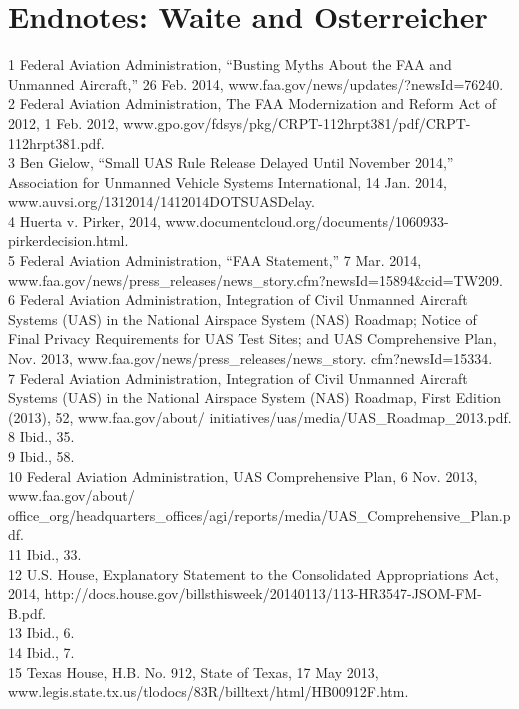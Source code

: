 \section{Endnotes: Waite and Osterreicher}
1 Federal Aviation Administration, ``Busting Myths About the FAA and Unmanned Aircraft,'' 26 Feb.
2014, www.faa.gov/news/updates/?newsId=76240.\\
2 Federal Aviation Administration, The FAA Modernization and Reform Act of 2012, 1 Feb. 2012,
www.gpo.gov/fdsys/pkg/CRPT-112hrpt381/pdf/CRPT-112hrpt381.pdf.\\
3 Ben Gielow, ``Small UAS Rule Release Delayed Until November 2014,'' Association for Unmanned
Vehicle Systems International, 14 Jan. 2014, www.auvsi.org/1312014/1412014DOTSUASDelay.\\
4 Huerta v. Pirker, 2014, www.documentcloud.org/documents/1060933-pirkerdecision.html.\\
5 Federal Aviation Administration, ``FAA Statement,'' 7 Mar. 2014, www.faa.gov/news/press_releases/news_story.cfm?newsId=15894&cid=TW209.\\
6 Federal Aviation Administration, Integration of Civil Unmanned Aircraft Systems (UAS) in the
National Airspace System (NAS) Roadmap; Notice of Final Privacy Requirements for UAS Test
Sites; and UAS Comprehensive Plan, Nov. 2013, www.faa.gov/news/press_releases/news_story.
cfm?newsId=15334.\\
7 Federal Aviation Administration, Integration of Civil Unmanned Aircraft Systems (UAS) in
the National Airspace System (NAS) Roadmap, First Edition (2013), 52, www.faa.gov/about/
initiatives/uas/media/UAS_Roadmap_2013.pdf.\\
8 Ibid., 35.\\
9 Ibid., 58.\\
10 Federal Aviation Administration, UAS Comprehensive Plan, 6 Nov. 2013, www.faa.gov/about/
office_org/headquarters_offices/agi/reports/media/UAS_Comprehensive_Plan.pdf.\\
11 Ibid., 33.\\
12 U.S. House, Explanatory Statement to the Consolidated Appropriations Act, 2014,
http://docs.house.gov/billsthisweek/20140113/113-HR3547-JSOM-FM-B.pdf.\\
13 Ibid., 6.\\
14 Ibid., 7.\\
15 Texas House, H.B. No. 912, State of Texas, 17 May 2013,
www.legis.state.tx.us/tlodocs/83R/billtext/html/HB00912F.htm.\\

